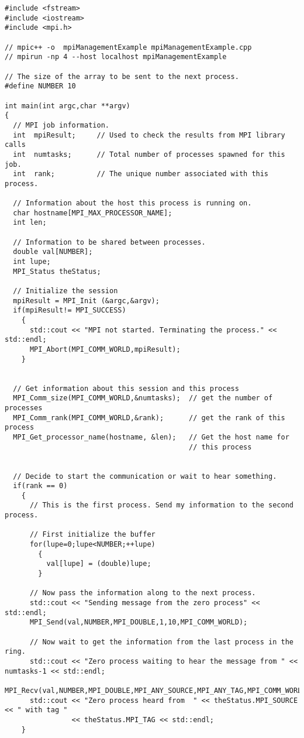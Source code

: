 \lstset{language=C++, numbers=left, numberstyle=\tiny, stepnumber=1,
  numbersep=5pt, commentstyle=\scriptsize}
\begin{lstlisting}[caption={Example of blocking communication.},
                   basicstyle=\scriptsize,
                   label=listing:blockingCommunication]
#include <fstream>
#include <iostream>
#include <mpi.h>

// mpic++ -o  mpiManagementExample mpiManagementExample.cpp 
// mpirun -np 4 --host localhost mpiManagementExample

// The size of the array to be sent to the next process.
#define NUMBER 10

int main(int argc,char **argv)
{
  // MPI job information.
  int  mpiResult;     // Used to check the results from MPI library calls
  int  numtasks;      // Total number of processes spawned for this job.
  int  rank;          // The unique number associated with this process.

  // Information about the host this process is running on.
  char hostname[MPI_MAX_PROCESSOR_NAME]; 
  int len;

  // Information to be shared between processes.
  double val[NUMBER];
  int lupe;
  MPI_Status theStatus;

  // Initialize the session
  mpiResult = MPI_Init (&argc,&argv);
  if(mpiResult!= MPI_SUCCESS)
    {
      std::cout << "MPI not started. Terminating the process." << std::endl;
      MPI_Abort(MPI_COMM_WORLD,mpiResult);
    }


  // Get information about this session and this process 
  MPI_Comm_size(MPI_COMM_WORLD,&numtasks);  // get the number of processes
  MPI_Comm_rank(MPI_COMM_WORLD,&rank);      // get the rank of this process
  MPI_Get_processor_name(hostname, &len);   // Get the host name for
                                            // this process


  // Decide to start the communication or wait to hear something.
  if(rank == 0)
    {
      // This is the first process. Send my information to the second process.

      // First initialize the buffer
      for(lupe=0;lupe<NUMBER;++lupe)
        {
          val[lupe] = (double)lupe;
        }

      // Now pass the information along to the next process.
      std::cout << "Sending message from the zero process" << std::endl;
      MPI_Send(val,NUMBER,MPI_DOUBLE,1,10,MPI_COMM_WORLD);

      // Now wait to get the information from the last process in the ring.
      std::cout << "Zero process waiting to hear the message from " << numtasks-1 << std::endl;
      MPI_Recv(val,NUMBER,MPI_DOUBLE,MPI_ANY_SOURCE,MPI_ANY_TAG,MPI_COMM_WORLD,&theStatus);
      std::cout << "Zero process heard from  " << theStatus.MPI_SOURCE << " with tag " 
                << theStatus.MPI_TAG << std::endl;
    }


\end{lstlisting}
